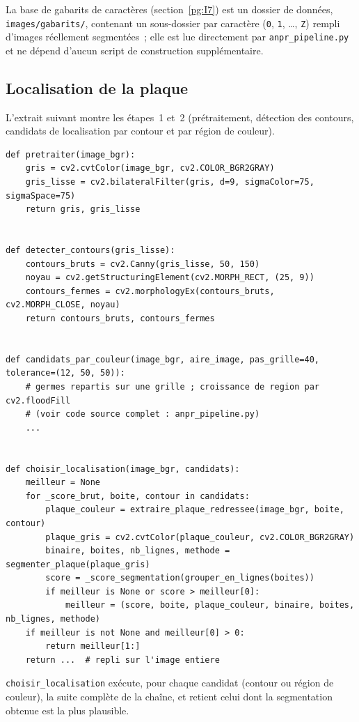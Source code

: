 \documentclass[11pt,a4paper]{article}
\begin{document}
La base de gabarits de caractères (section~\ref{pg:I7}) est un dossier de données, \texttt{images/gabarits/}, contenant un sous-dossier par caractère (\texttt{0}, \texttt{1}, \ldots, \texttt{Z}) rempli d'images réellement segmentées~; elle est lue directement par \texttt{anpr\_pipeline.py} et ne dépend d'aucun script de construction supplémentaire.

\subsection{Localisation de la plaque}
\label{pg:III1}

L'extrait suivant montre les étapes~1 et~2 (prétraitement, détection des contours, candidats de localisation par contour et par région de couleur).

\begin{lstlisting}
def pretraiter(image_bgr):
    gris = cv2.cvtColor(image_bgr, cv2.COLOR_BGR2GRAY)
    gris_lisse = cv2.bilateralFilter(gris, d=9, sigmaColor=75, sigmaSpace=75)
    return gris, gris_lisse


def detecter_contours(gris_lisse):
    contours_bruts = cv2.Canny(gris_lisse, 50, 150)
    noyau = cv2.getStructuringElement(cv2.MORPH_RECT, (25, 9))
    contours_fermes = cv2.morphologyEx(contours_bruts, cv2.MORPH_CLOSE, noyau)
    return contours_bruts, contours_fermes


def candidats_par_couleur(image_bgr, aire_image, pas_grille=40, tolerance=(12, 50, 50)):
    # germes repartis sur une grille ; croissance de region par cv2.floodFill
    # (voir code source complet : anpr_pipeline.py)
    ...


def choisir_localisation(image_bgr, candidats):
    meilleur = None
    for _score_brut, boite, contour in candidats:
        plaque_couleur = extraire_plaque_redressee(image_bgr, boite, contour)
        plaque_gris = cv2.cvtColor(plaque_couleur, cv2.COLOR_BGR2GRAY)
        binaire, boites, nb_lignes, methode = segmenter_plaque(plaque_gris)
        score = _score_segmentation(grouper_en_lignes(boites))
        if meilleur is None or score > meilleur[0]:
            meilleur = (score, boite, plaque_couleur, binaire, boites, nb_lignes, methode)
    if meilleur is not None and meilleur[0] > 0:
        return meilleur[1:]
    return ...  # repli sur l'image entiere
\end{lstlisting}

\texttt{choisir\_localisation} exécute, pour chaque candidat (contour ou région de couleur), la suite complète de la chaîne, et retient celui dont la segmentation obtenue est la plus plausible.
\end{document}
